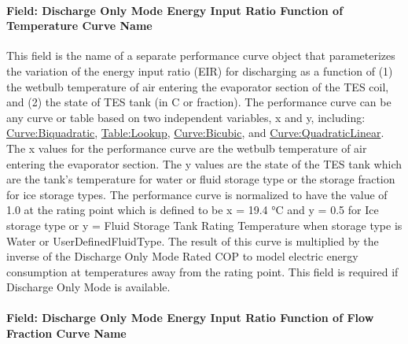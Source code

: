 \paragraph{Field: Discharge Only Mode Energy Input Ratio Function of Temperature Curve Name}\label{field-discharge-only-mode-energy-input-ratio-function-of-temperature-curve-name}

This field is the name of a separate performance curve object that parameterizes the variation of the energy input ratio (EIR) for discharging as a function of (1) the wetbulb temperature of air entering the evaporator section of the TES coil, and (2) the state of TES tank (in C or fraction). The performance curve can be any curve or table based on two independent variables, x and y, including: \hyperref[curvebiquadratic]{Curve:Biquadratic}, \hyperref[tablelookup]{Table:Lookup}, \hyperref[curvebicubic]{Curve:Bicubic}, and \hyperref[curvequadraticlinear]{Curve:QuadraticLinear}. The x values for the performance curve are the wetbulb temperature of air entering the evaporator section. The y values are the state of the TES tank which are the tank's temperature for water or fluid storage type or the storage fraction for ice storage types. The performance curve is normalized to have the value of 1.0 at the rating point which is defined to be x = 19.4 °C and y = 0.5 for Ice storage type or y = Fluid Storage Tank Rating Temperature when storage type is Water or UserDefinedFluidType. The result of this curve is multiplied by the inverse of the Discharge Only Mode Rated COP to model electric energy consumption at temperatures away from the rating point. This field is required if Discharge Only Mode is available.

\paragraph{Field: Discharge Only Mode Energy Input Ratio Function of Flow Fraction Curve Name}\label{field-discharge-only-mode-energy-input-ratio-function-of-flow-fraction-curve-name}

